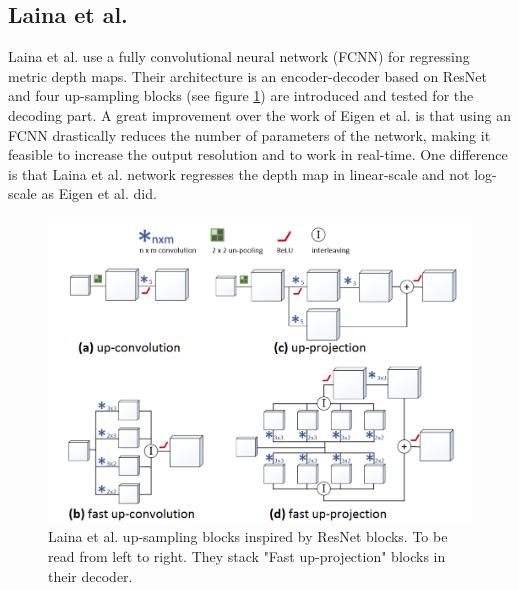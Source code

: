 \subsection{Laina et al.}
Laina et al. \cite{Laina} use a fully convolutional neural network (FCNN) for regressing metric depth maps.
Their architecture is an encoder-decoder based on ResNet \cite{ResNet} and four up-sampling blocks (see figure \ref{fig:Laina}) are introduced and tested for the decoding part.
A great improvement over the work of Eigen et al. is that using an FCNN drastically reduces the number of parameters of the network, making it feasible to increase the output resolution and to work in real-time.
One difference is that Laina et al. network regresses the depth map in linear-scale and not log-scale as Eigen et al. did.

\begin{figure}
\centering
\includegraphics[scale=0.4]{figs/Laina}
\caption{Laina et al. \cite{Laina} up-sampling blocks inspired by ResNet blocks. To be read from left to right. They stack "Fast up-projection" blocks in their decoder. \label{fig:Laina}}
\end{figure}

